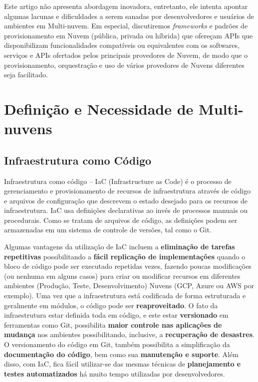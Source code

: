 \documentclass[12pt]{article}
\begin{document}
	    Este artigo não apresenta abordagem inovadora, entretanto, ele intenta apontar algumas lacunas e dificuldades a serem sanadas por desenvolvedores e usuários de ambientes em Multi-nuvem. Em especial, discutiremos \textit{frameworks} e padrões de provisionamento em Nuvem (pública, privada ou híbrida) que ofereçam APIs que disponibilizam funcionalidades compatíveis ou equivalentes com os softwares,  serviços e APIs ofertados pelos principais provedores de Nuvem, de modo que o provisionamento, orquestração e uso de vários provedores de Nuvens diferentes seja facilitado.
		
	\section{Definição e Necessidade de Multi-nuvens}
	
		\subsection{Infraestrutura como Código}
	
	Infraestrutura como código – IaC (Infrastructure as Code) é o processo de gerenciamento e provisionamento de recursos de infraestrutura através de código e arquivos de configuração que descrevem o estado desejado para os recursos de infraestrutura. IaC usa definições declarativas ao invés de processos manuais ou procedurais. Como se tratam de arquivos de código, as definições podem ser armazenadas em um sistema de controle de versões, tal como o Git.
	
	Algumas vantagens da utilização de IaC incluem a \textbf{eliminação de tarefas repetitivas} possibilitando a  \textbf{fácil replicação de implementações} quando o bloco de código pode ser executado repetidas vezes, fazendo poucas modificações (ou nenhuma em alguns casos) para criar ou modificar recursos em diferentes ambientes (Produção, Teste, Desenvolvimento) Nuvens (GCP, Azure ou AWS por exemplo). Uma vez que a infraestrutura  está codificada de forma estruturada e geralmente em módulos, o código pode ser \textbf{reaproveitado}. O fato da infraestrutura estar definida toda em código, e este estar \textbf{versionado} em ferramentas como Git, possibilita \textbf{maior controle nas aplicações de mudança} nos ambientes possibilitando, inclusive, a \textbf{recuperação de desastres}. O versionamento do código em Git, também possibilita a simplificação da \textbf{documentação do código}, bem como sua \textbf{manutenção e suporte}. Além disso, com IaC, fica fácil utilizar-se das mesmas técnicas de \textbf{planejamento e testes automatizados} há muito tempo utilizadas por desenvolvedores.	
	
\end{document}
